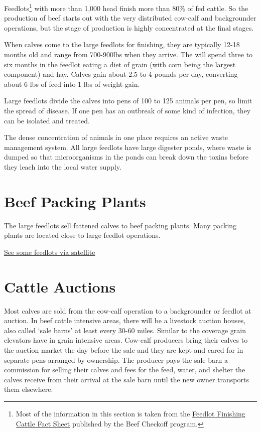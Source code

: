 \documentclass[
  letterpaper,
  DIV=11,
  numbers=noendperiod]{scrreprt}
\begin{document}
Feedlots\footnote{Most of the information in this section is taken from
  the
  \href{http://www.beefusa.org/uDocs/Feedlot\%20finishing\%20fact\%20sheet\%20FINAL_4\%2026\%2006.pdf}{Feedlot
  Finishing Cattle Fact Sheet} published by the Beef Checkoff program.}
with more than 1,000 head finish more than 80\% of fed cattle. So the
production of beef starts out with the very distributed cow-calf and
backgrounder operations, but the stage of production is highly
concentrated at the final stages.

When calves come to the large feedlots for finishing, they are typically
12-18 months old and range from 700-900lbs when they arrive. The will
spend three to six months in the feedlot eating a diet of grain (with
corn being the largest component) and hay. Calves gain about 2.5 to 4
pounds per day, converting about 6 lbs of feed into 1 lbs of weight
gain.

Large feedlots divide the calves into pens of 100 to 125 animals per
pen, so limit the spread of disease. If one pen has an outbreak of some
kind of infection, they can be isolated and treated.

The dense concentration of animals in one place requires an active waste
management system. All large feedlots have large digester ponds, where
waste is dumped so that microorganisms in the ponds can break down the
toxins before they leach into the local water supply.

\section{Beef Packing Plants}\label{beef-packing-plants}

The large feedlots sell fattened calves to beef packing plants. Many
packing plants are located close to large feedlot operations.

\href{http://maps.google.com}{See some feedlots via satellite}

\section{Cattle Auctions}\label{cattle-auctions}

Most calves are sold from the cow-calf operation to a backgrounder or
feedlot at auction. In beef cattle intensive areas, there will be a
livestock auction houses, also called `sale barns' at least every 30-60
miles. Similar to the coverage grain elevators have in grain intensive
areas. Cow-calf producers bring their calves to the auction market the
day before the sale and they are kept and cared for in separate pens
arranged by ownership. The producer pays the sale barn a commission for
selling their calves and fees for the feed, water, and shelter the
calves receive from their arrival at the sale barn until the new owner
transports them elsewhere.
\end{document}
